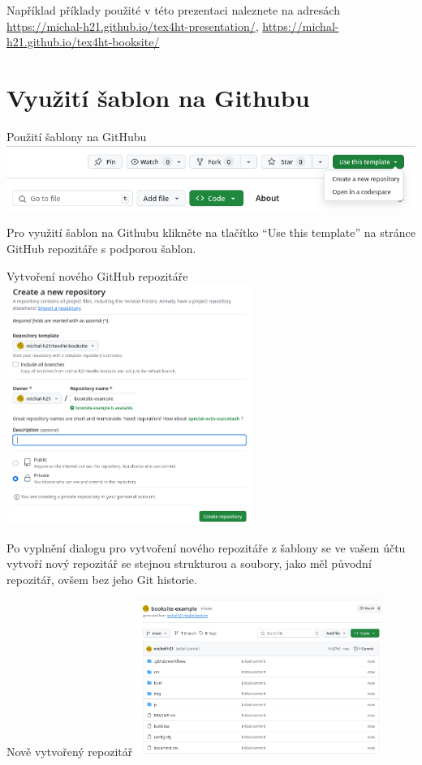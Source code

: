 Například příklady použité v této prezentaci naleznete na adresách \url{https://michal-h21.github.io/tex4ht-presentation/},
\url{https://michal-h21.github.io/tex4ht-booksite/}

\section{Využití šablon na Githubu}
\begin{frame}[fragile]{Použití šablony na GitHubu}
  \includegraphics[width=\textwidth,alt={}]{img/template-use.png}
\end{frame}

Pro využití šablon na Githubu klikněte na tlačítko
\enquote{Use this template} na stránce GitHub repozitáře s podporou šablon. 


\begin{frame}[fragile]{Vytvoření nového GitHub repozitáře}
  \includegraphics[width=0.6\textwidth,alt={Dialog vytvoření nového repozitáře ze šablony}]{img/new-repo.png}
\end{frame}

Po vyplnění dialogu pro vytvoření nového repozitáře z šablony se ve vašem účtu vytvoří
nový repozitář se stejnou strukturou a soubory, jako měl původní repozitář, ovšem bez jeho 
Git historie.

\begin{frame}[fragile]{Nově vytvořený repozitář}
\includegraphics[width=0.6\textwidth]{img/created-repo.png}
\end{frame}


